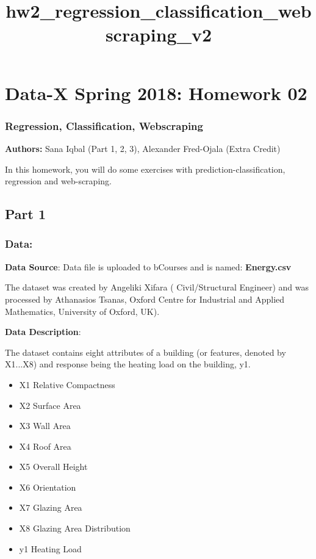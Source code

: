 \documentclass[11pt]{article}
\title{hw2\_regression\_classification\_webscraping\_v2}
\providecommand{\tightlist}{%
      \setlength{\itemsep}{0pt}\setlength{\parskip}{0pt}}
\begin{document}
    
    
    \maketitle
    
    

    
    \section{Data-X Spring 2018: Homework
02}\label{data-x-spring-2018-homework-02}

\subsubsection{Regression, Classification,
Webscraping}\label{regression-classification-webscraping}

\textbf{Authors:} Sana Iqbal (Part 1, 2, 3), Alexander Fred-Ojala (Extra
Credit)

In this homework, you will do some exercises with
prediction-classification, regression and web-scraping.

    \subsection{Part 1}\label{part-1}

    \subsubsection{Data:}\label{data}

\textbf{Data Source}: Data file is uploaded to bCourses and is named:
\textbf{Energy.csv}

The dataset was created by Angeliki Xifara ( Civil/Structural Engineer)
and was processed by Athanasios Tsanas, Oxford Centre for Industrial and
Applied Mathematics, University of Oxford, UK).

\textbf{Data Description}:

The dataset contains eight attributes of a building (or features,
denoted by X1...X8) and response being the heating load on the building,
y1.

\begin{itemize}
\tightlist
\item
  X1 Relative Compactness
\item
  X2 Surface Area
\item
  X3 Wall Area
\item
  X4 Roof Area
\item
  X5 Overall Height
\item
  X6 Orientation
\item
  X7 Glazing Area
\item
  X8 Glazing Area Distribution
\item
  y1 Heating Load
\end{itemize}
\end{document}
